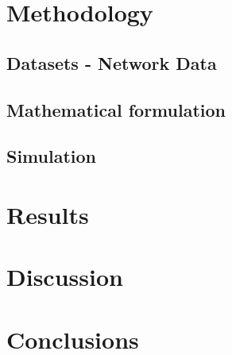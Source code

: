 \section{Methodology}
\subsection{Datasets - Network Data}
\subsection{Mathematical formulation}
\subsection{Simulation}

\section{Results}
\section{Discussion}
\section{Conclusions}


